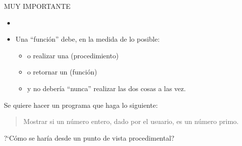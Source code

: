 \documentclass[10pt,envcountsect,spanish]{beamer}
\begin{document}
\begin{frame}{MUY IMPORTANTE}

\begin{itemize}%

\item {}

\item Una ``función'' debe, en la medida de lo posible:
	\begin{itemize}
	\item o realizar una  (procedimiento)
	\item o retornar un  (función) 
	\item y no debería ``nunca'' realizar las dos cosas a las vez.
	\end{itemize}

\end{itemize}

\begin{ejercicio}{}
Se quiere hacer un programa  que haga lo siguiente:

\begin{quote}
Mostrar si un número entero, dado por el usuario, es un número primo. 
\end{quote}

?`Cómo se haría desde un punto de vista procedimental?

\end{ejercicio}
\end{frame}
\end{document}
